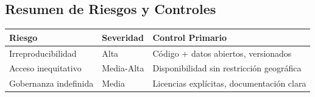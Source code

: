 \subsection{Resumen de Riesgos y Controles}

\begin{table}[H]
\centering
\small
\begin{tabular}{|p{2.5cm}|p{3cm}|p{3.5cm}|}
\hline
\textbf{Riesgo} & \textbf{Severidad} & \textbf{Control Primario} \\
\hline
Irreproducibilidad & Alta & Código + datos abiertos, versionados \\
\hline
Acceso inequitativo & Media-Alta & Disponibilidad sin restricción geográfica \\
\hline
Gobernanza indefinida & Media & Licencias explícitas, documentación clara \\
\hline
\end{tabular}
\end{table}
